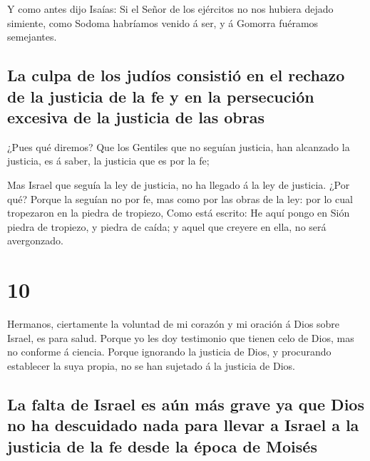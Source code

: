  Y como antes dijo Isaías: Si el Señor de los ejércitos no
nos hubiera dejado simiente, como Sodoma habríamos venido á ser, y á
Gomorra fuéramos semejantes.

\hypertarget{la-culpa-de-los-juduxedos-consistiuxf3-en-el-rechazo-de-la-justicia-de-la-fe-y-en-la-persecuciuxf3n-excesiva-de-la-justicia-de-las-obras}{%
\subsection{La culpa de los judíos consistió en el rechazo de la
justicia de la fe y en la persecución excesiva de la justicia de las
obras}\label{la-culpa-de-los-juduxedos-consistiuxf3-en-el-rechazo-de-la-justicia-de-la-fe-y-en-la-persecuciuxf3n-excesiva-de-la-justicia-de-las-obras}}

 ¿Pues qué diremos? Que los Gentiles que no seguían
justicia, han alcanzado la justicia, es á saber, la justicia que es por
la fe;

 Mas Israel que seguía la ley de justicia, no ha llegado á
la ley de justicia.  ¿Por qué? Porque la seguían no por fe,
mas como por las obras de la ley: por lo cual tropezaron en la piedra de
tropiezo,  Como está escrito: He aquí pongo en Sión piedra
de tropiezo, y piedra de caída; y aquel que creyere en ella, no será
avergonzado.

\hypertarget{section-9}{%
\section{10}\label{section-9}}

 Hermanos, ciertamente la voluntad de mi corazón y mi
oración á Dios sobre Israel, es para salud.  Porque yo les
doy testimonio que tienen celo de Dios, mas no conforme á ciencia.
 Porque ignorando la justicia de Dios, y procurando
establecer la suya propia, no se han sujetado á la justicia de Dios.

\hypertarget{la-falta-de-israel-es-auxfan-muxe1s-grave-ya-que-dios-no-ha-descuidado-nada-para-llevar-a-israel-a-la-justicia-de-la-fe-desde-la-uxe9poca-de-moisuxe9s}{%
\subsection{La falta de Israel es aún más grave ya que Dios no ha
descuidado nada para llevar a Israel a la justicia de la fe desde la
época de
Moisés}\label{la-falta-de-israel-es-auxfan-muxe1s-grave-ya-que-dios-no-ha-descuidado-nada-para-llevar-a-israel-a-la-justicia-de-la-fe-desde-la-uxe9poca-de-moisuxe9s}}

